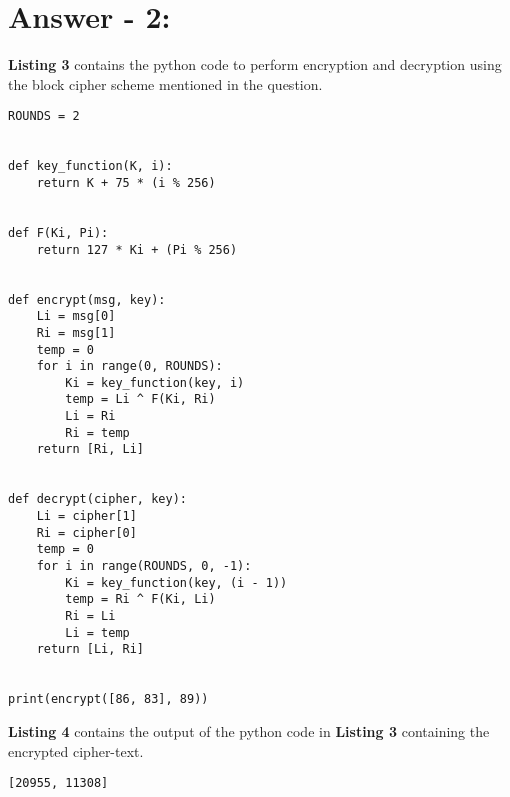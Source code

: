 \documentclass[10pt,a4paper,oneside]{article}
\begin{document}
\section*{Answer - 2:}

\textbf{Listing 3} contains the python code to perform encryption and decryption using the block cipher scheme mentioned in the question. 

\begin{lstlisting}
ROUNDS = 2


def key_function(K, i):
    return K + 75 * (i % 256)


def F(Ki, Pi):
    return 127 * Ki + (Pi % 256)


def encrypt(msg, key):
    Li = msg[0]
    Ri = msg[1]
    temp = 0
    for i in range(0, ROUNDS):
        Ki = key_function(key, i)
        temp = Li ^ F(Ki, Ri)
        Li = Ri
        Ri = temp
    return [Ri, Li]


def decrypt(cipher, key):
    Li = cipher[1]
    Ri = cipher[0]
    temp = 0
    for i in range(ROUNDS, 0, -1):
        Ki = key_function(key, (i - 1))
        temp = Ri ^ F(Ki, Li)
        Ri = Li
        Li = temp
    return [Li, Ri]


print(encrypt([86, 83], 89))
\end{lstlisting}
\textbf{Listing 4} contains the output of the python code in \textbf{Listing 3} containing the encrypted cipher-text.

\begin{lstlisting}
[20955, 11308]
\end{lstlisting}
\end{document}
